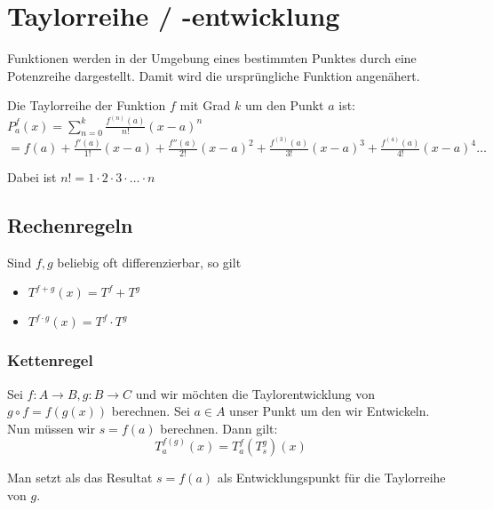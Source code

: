 \section{Taylorreihe / -entwicklung}
Funktionen werden in der Umgebung eines bestimmten Punktes durch eine
Potenzreihe dargestellt. Damit wird die ursprüngliche Funktion angenähert.

Die Taylorreihe der Funktion $f$ mit Grad $k$ um den Punkt $a$ ist:
{\small
$P_a^f(x) = \sum_{n = 0}^k \frac{f^{(n)}(a)}{n!}(x - a)^n$\newline
$= f(a) + \frac{f'(a)}{1!}(x-a) + \frac{f''(a)}{2!}(x-a)^2 +
\frac{f^{(3)}(a)}{3!}(x-a)^3 + \frac{f^{(4)}(a)}{4!}(x-a)^4\ldots$
}

Dabei ist $n! = 1 \cdot 2 \cdot 3 \cdot \ldots \cdot n$


\subsection{Rechenregeln}
Sind $f,g$ beliebig oft differenzierbar, so gilt
\begin{itemize}
  \item $T^{f+g}(x) = T^f + T^g$
  \item $T^{f \cdot g}(x) = T^f \cdot T^g$
\end{itemize}

\subsubsection{Kettenregel}
Sei $f: A \to B, g: B \to C$ und wir möchten die Taylorentwicklung von $g \circ
f = f(g(x))$ berechnen. Sei $a \in A$ unser Punkt um den wir Entwickeln. Nun
müssen wir $s = f(a)$ berechnen. Dann gilt:
{\small
\[
T^{f(g)}_a (x) = T^f_a(T^g_s)(x)
\]
}

Man setzt als das Resultat $s = f(a)$ als Entwicklungspunkt für die Taylorreihe
von $g$.

